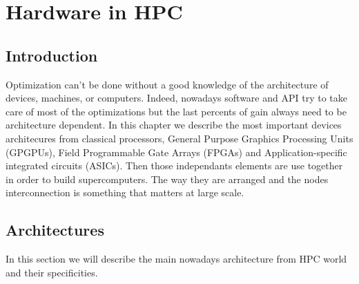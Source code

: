 
\chapter{Hardware in HPC}

\section{Introduction}

Optimization can't be done without a good knowledge of the architecture of devices, machines, or computers. 
Indeed, nowadays software and API try to take care of most of the optimizations but the last percents of gain always need to be architecture dependent. 
In this chapter we describe the most important devices architecures from classical processors, General Purpose Graphics Processing Units (GPGPUs), Field Programmable Gate Arrays (FPGAs) and Application-specific integrated circuits (ASICs).
Then those independants elements are use together in order to build supercomputers. 
The way they are arranged and the nodes interconnection is something that matters at large scale. 

\section{Architectures}
In this section we will describe the main nowadays architecture from HPC world and their specificities.

